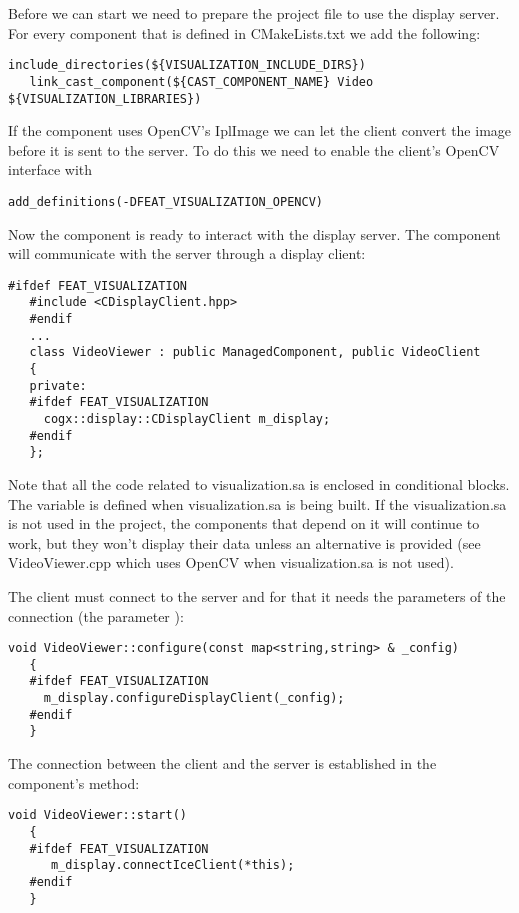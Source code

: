 Before we can start we need to prepare the project file to use the display server.
For every component that is defined in CMakeLists.txt we add the following:

\begin{Verbatim}[fontsize=\scriptsize,gobble=3]
   include_directories(${VISUALIZATION_INCLUDE_DIRS})
   link_cast_component(${CAST_COMPONENT_NAME} Video ${VISUALIZATION_LIBRARIES})
\end{Verbatim}

If the component uses OpenCV's IplImage we can let the client convert the image
before it is sent to the server. To do this we need to enable the client's OpenCV
interface with

\begin{Verbatim}[fontsize=\scriptsize,gobble=3]
   add_definitions(-DFEAT_VISUALIZATION_OPENCV)
\end{Verbatim}

Now the component is ready to interact with the display server. The component
will communicate with the server through a display client:

\begin{Verbatim}[fontsize=\scriptsize,gobble=3]
   #ifdef FEAT_VISUALIZATION
   #include <CDisplayClient.hpp>
   #endif
   ...
   class VideoViewer : public ManagedComponent, public VideoClient
   {
   private:
   #ifdef FEAT_VISUALIZATION
     cogx::display::CDisplayClient m_display;
   #endif
   };
\end{Verbatim}

Note that all the code related to visualization.sa is enclosed in conditional
blocks. The variable  is defined when
visualization.sa is being built. If the visualization.sa is not used in the
project, the components that depend on it will continue to work, but they won't
display their data unless an alternative is provided (see VideoViewer.cpp which
uses OpenCV when visualization.sa is not used).

The client must connect to the server and for that it needs the parameters of the
connection (the parameter ):

\begin{Verbatim}[fontsize=\scriptsize,gobble=3]
   void VideoViewer::configure(const map<string,string> & _config)
   {
   #ifdef FEAT_VISUALIZATION
     m_display.configureDisplayClient(_config);
   #endif
   }
\end{Verbatim}

The connection between the client and the server is established in the component's
 method:
\begin{Verbatim}[fontsize=\scriptsize,gobble=3]
   void VideoViewer::start()
   {
   #ifdef FEAT_VISUALIZATION
      m_display.connectIceClient(*this);
   #endif
   }
\end{Verbatim}


